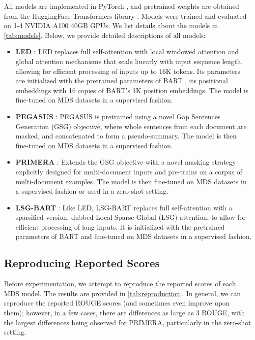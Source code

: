 \documentclass[11pt]{article}
\begin{document}
All models are implemented in PyTorch \citep{pytorch}, and pretrained weights are obtained from the HuggingFace Transformers library \citep{hf-transformers}. Models were trained and evaluated on 1-4 NVIDIA A100 40GB GPUs. We list details about the models in \autoref{tab:models}. Below, we provide detailed descriptions of all models:

\begin{itemize}
    \item \textbf{LED} \citep{Beltagy2020LongformerTL}: LED replaces full self-attention with local windowed attention and global attention mechanisms that scale linearly with input sequence length, allowing for efficient processing of inputs up to 16K tokens. Its parameters are initialized with the pretrained parameters of BART \citep{lewis-etal-2020-bart}, its positional embeddings with 16 copies of BART's 1K position embeddings. The model is fine-tuned on MDS datasets in a supervised fashion.
    \item \textbf{PEGASUS} \citep{pegasus}: PEGASUS is pretrained using a novel Gap Sentences Generation (GSG) objective, where whole sentences from each document are masked, and concatenated to form a pseudo-summary. The model is then fine-tuned on MDS datasets in a supervised fashion. 
    \item \textbf{PRIMERA} \citep{xiao-etal-2022-primera}: Extends the GSG objective with a novel masking strategy explicitly designed for multi-document inputs and pre-trains on a corpus of multi-document examples. The model is then fine-tuned on MDS datasets in a supervised fashion or used in a zero-shot setting.
    \item \textbf{LSG-BART} \citep{condevaux2022lsg}: Like LED, LSG-BART replaces full self-attention with a sparsified version, dubbed Local-Sparse-Global (LSG) attention, to allow for efficient processing of long inputs. It is initialized with the pretrained parameters of BART and fine-tuned on MDS datasets in a supervised fashion.
\end{itemize}

\subsection{Reproducing Reported Scores} Before experimentation, we attempt to reproduce the reported scores of each MDS model. The results are provided in \autoref{tab:reproduction}. In general, we can reproduce the reported ROUGE scores (and sometimes even improve upon them); however, in a few cases, there are differences as large as 3 ROUGE, with the largest differences being observed for PRIMERA, particularly in the zero-shot setting.
\end{document}
